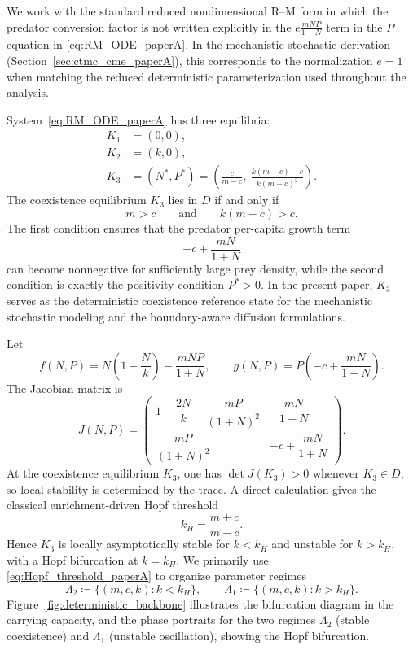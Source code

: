 \documentclass[pdflatex,sn-mathphys-ay]{sn-jnl}
\theoremstyle{thmstyleone}
\theoremstyle{definition}
\theoremstyle{remark}
\begin{document}
We work with the standard reduced nondimensional R--M form in which the predator conversion factor is not written explicitly in the $e\frac{mNP}{1+N}$ term in the $P$ equation in \eqref{eq:RM_ODE_paperA}. In the mechanistic stochastic derivation (Section~\ref{sec:ctmc_cme_paperA}), this corresponds to the normalization \(e=1\) when matching the reduced deterministic parameterization used throughout the analysis.

System~\eqref{eq:RM_ODE_paperA} has three equilibria:
\begin{align}
K_1 &= (0,0), \label{eq:K1_paperA}\\
K_2 &= (k,0), \label{eq:K2_paperA}\\
K_3 &= (N^*,P^*) 
= \left(\frac{c}{m-c},\ \frac{k(m-c)-c}{k(m-c)^2}\right). \label{eq:K3_paperA}
\end{align}
The coexistence equilibrium \(K_3\) lies in \(D\) if and only if
\begin{equation}
\label{eq:coexistence_feasibility_paperA}
m>c
\qquad \text{and} \qquad
k(m-c)>c.
\end{equation}
The first condition ensures that the predator per-capita growth term
\[
-c+\frac{mN}{1+N}
\]
can become nonnegative for sufficiently large prey density, while the second condition is exactly the positivity condition \(P^*>0\). In the present paper, \(K_3\) serves as the deterministic coexistence reference state for the mechanistic stochastic modeling and the boundary-aware diffusion formulations.

Let
\[
f(N,P)=N\!\left(1-\frac{N}{k}\right)-\frac{mNP}{1+N},
\qquad
g(N,P)=P\!\left(-c+\frac{mN}{1+N}\right).
\]
The Jacobian matrix is
\begin{equation}
\label{eq:Jacobian_paperA}
J(N,P)=
\begin{pmatrix}
1-\dfrac{2N}{k}-\dfrac{mP}{(1+N)^2} & -\dfrac{mN}{1+N}\\[10pt]
\dfrac{mP}{(1+N)^2} & -c+\dfrac{mN}{1+N}
\end{pmatrix}.
\end{equation}
At the coexistence equilibrium \(K_3\), one has \(\det J(K_3)>0\) whenever \(K_3\in D\), so local stability is determined by the trace. A direct calculation gives the classical enrichment-driven Hopf threshold \citep{grunert_evolutionarily_2021}
\begin{equation}
\label{eq:Hopf_threshold_paperA}
k_H=\frac{m+c}{m-c}.
\end{equation}
Hence \(K_3\) is locally asymptotically stable for \(k<k_H\) and unstable for \(k>k_H\), with a Hopf bifurcation at \(k=k_H\). We primarily use \eqref{eq:Hopf_threshold_paperA} to organize parameter regimes
\begin{equation}
\label{eq:Lambda_regions_paperA}
\Lambda_2 \coloneqq \{(m,c,k): k<k_H\},
\qquad
\Lambda_1 \coloneqq \{(m,c,k): k>k_H\}.
\end{equation}
Figure~\ref{fig:deterministic_backbone} illustrates the bifurcation diagram in the carrying capacity, and the phase portraits for the two regimes $\Lambda_2$ (stable coexistence) and $\Lambda_1$ (unstable oscillation), showing the Hopf bifurcation.
\end{document}

